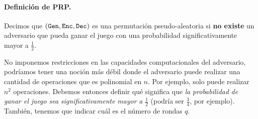 \paragraph{Definición de PRP.} Decimos que $(\texttt{Gen}, \texttt{Enc}, \texttt{Dec})$ es una permutación pseudo-aleatoria si \textbf{no existe} un adversario que pueda ganar el juego con una probabilidad significativamente mayor a $\frac{1}{2}$. \medbreak

No imponemos restricciones en las capacidades computacionales del adversario, podríamos tener una noción más débil donde el adversario puede realizar una cantidad de operaciones que es polinomial en $n$. Por ejemplo, solo puede realizar $n^2$ operaciones. Debemos entonces definir qué significa que \textit{la probabilidad de ganar el juego sea significativamente mayor a} $\frac{1}{2}$ (podría ser $\frac{3}{4}$, por ejemplo). También, tenemos que indicar cuál es el número de rondas $q$.

